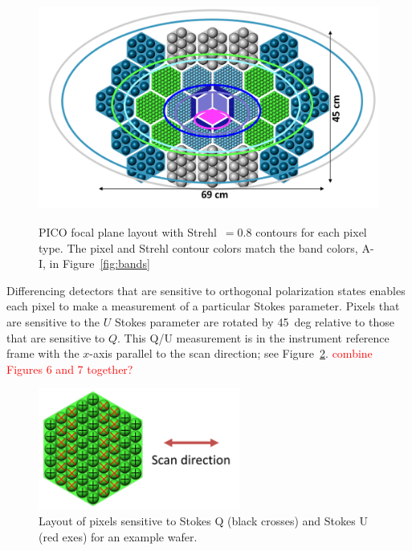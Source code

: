 \documentclass[]{spie}  %
\newcommand{\comr}[1]{\textcolor{red}{#1}}
\begin{document}
\begin{figure} [ht]
\begin{center}
\includegraphics[height=7.5cm]{version3_focal_plane.png}
\end{center}
\caption { \label{fig:focal_plane} 
PICO focal plane layout with Strehl~$=0.8$ contours for each pixel type. The pixel and Strehl contour colors match the band colors, A-I, 
in Figure~\ref{fig:bands} }
\end{figure} 

Differencing detectors that are sensitive to orthogonal polarization states enables each pixel to make a measurement of 
a particular Stokes parameter. Pixels that are sensitive to the $U$ Stokes parameter are rotated by 45~deg relative to those
that are sensitive to $Q$. This Q/U measurement is in the instrument reference frame with the $x$-axis parallel to the scan 
direction; see Figure~\ref{fig:QU}.  \comr{combine Figures 6 and 7 together?}

\begin{figure} [ht]
\begin{center}
\includegraphics[height=4cm]{QU_wafer.png}
\end{center}
\caption { \label{fig:QU} 
Layout of pixels sensitive to Stokes Q (black crosses) and Stokes U (red exes) for an example wafer.}
\end{figure}
\end{document}
